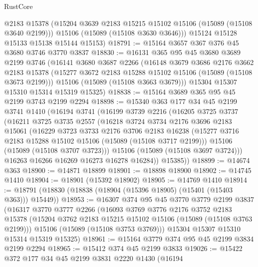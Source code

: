 \begin{lexlean}{RustCore}
\begin{coremodule}
        @2183
        @15378
        (@15204 @3639 @2183 @15215 @15102 @15106 (@15089 (@15108 @3640 @2199)))
        @15106
        (@15089 (@15108 @3630 @3646)))
      @15124
      @15128
      @15133
      @15138
      @15144
      @15153)
@18791 := @15164 @3657 @367 @376 @45 @3680 @3746 @3770 @3837
@18830 := @16131
    @365
    @95
    @45
    @3680
    @3689
    @2199
    @3746
    (@16141
      @3680
      @3687
      @2266
      (@16148
        @3679
        @3686
        @2176
        @3662
        @2183
        @15378
        (@15277 @3672 @2183 @15288 @15102 @15106 (@15089 (@15108 @3673 @2199)))
        @15106
        (@15089 (@15108 @3663 @3679)))
      @15304
      @15307
      @15310
      @15314
      @15319
      @15325)
@18838 := @15164 @3689 @365 @95 @45 @2199 @3743 @2199 @2294
@18898 := @15340
    @363
    @177
    @34
    @45
    @2199
    @3741
    @1410
    (@16194
      @3741
      (@16199
        @3739
        @2216
        (@16205
          @3725
          @3737
          (@16211
            @3725
            @3735
            @2557
            (@16218
              @3724
              @3734
              @2176
              @3696
              @2183
              @15061
              (@16229
                @3723
                @3733
                @2176
                @3706
                @2183
                @16238
                (@15277 @3716 @2183 @15288 @15102 @15106 (@15089 (@15108 @3717 @2199)))
                @15106
                (@15089 (@15108 @3707 @3723)))
              @15106
              (@15089 (@15108 @3697 @3724)))
            @16263
            @16266
            @16269
            @16273
            @16278
            @16284))
        @15385))
@18899 := @14674 @363
@18900 := @14871 @18899
@18901 := @18898 @18900
@18902 := @14745 @1410
@18904 := @18901 (@15392 @18902)
@18905 := @14769 @1410
@18914 := @18791 (@18830 (@18838 (@18904 (@15396 @18905) (@15401 (@15403 @363))) @15449))
@18953 := @16307
    @374
    @95
    @45
    @3770
    @3779
    @2199
    @3837
    (@16317
      @3770
      @3777
      @2266
      (@16093
        @3769
        @3776
        @2176
        @3752
        @2183
        @15378
        (@15204 @3762 @2183 @15215 @15102 @15106 (@15089 (@15108 @3763 @2199)))
        @15106
        (@15089 (@15108 @3753 @3769)))
      @15304
      @15307
      @15310
      @15314
      @15319
      @15325)
@18961 := @15164 @3779 @374 @95 @45 @2199 @3834 @2199 @2294
@18965 := @15412 @374 @45 @2199 @3833
@19026 := @15422
    @372
    @177
    @34
    @45
    @2199
    @3831
    @2220
    @1430
    (@16194

\end{coremodule}
\end{lexlean}
